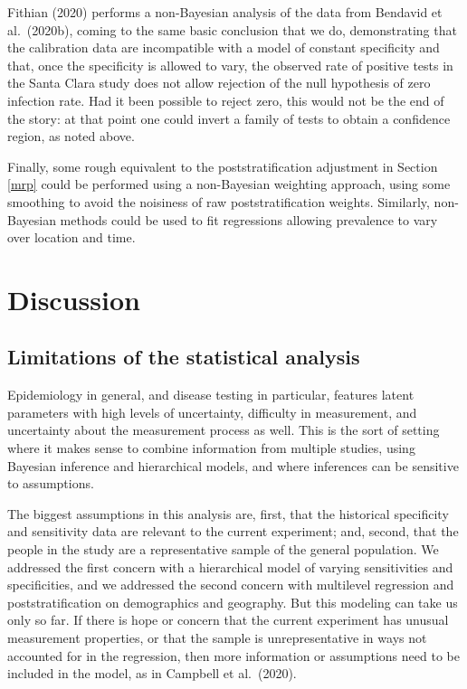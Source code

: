 \documentclass[11pt]{article}
\begin{document}
Fithian (2020) performs a non-Bayesian analysis of the data from Bendavid et al.\ (2020b), coming to the same basic conclusion that we do, demonstrating that the calibration data are incompatible with a model of constant specificity and that, once the specificity is allowed to vary, the observed rate of positive tests in the Santa Clara study does not allow rejection of the null hypothesis of zero infection rate.  Had it been possible to reject zero, this would not be the end of the story:  at that point one could invert a family of tests to obtain a confidence region, as noted above.

Finally, some rough equivalent to the poststratification adjustment in Section \ref{mrp} could be performed using a non-Bayesian weighting approach, using some smoothing to avoid the noisiness of raw poststratification weights.  Similarly, non-Bayesian methods could be used to fit regressions allowing prevalence to vary over location and time.


\section{Discussion}

\subsection{Limitations of the statistical analysis}

Epidemiology in general, and disease testing in particular, features
latent parameters with high levels of uncertainty, difficulty in
measurement, and uncertainty about the measurement process as well.
This is the sort of setting where it makes sense to combine
information from multiple studies, using Bayesian inference and
hierarchical models, and where inferences can be sensitive to
assumptions.

The biggest assumptions in this analysis are, first, that the
historical specificity and sensitivity data are relevant to the
current experiment; and, second, that the people in the study are a
representative sample of the general population.  We addressed the
first concern with a hierarchical model of varying sensitivities and
specificities, and we addressed the second concern with multilevel
regression and poststratification on demographics and geography.  But
this modeling can take us only so far.  If there is hope or concern
that the current experiment has unusual measurement properties, or
that the sample is unrepresentative in ways not accounted for in the
regression, then more information or assumptions need to be included
in the model, as in Campbell et al.\ (2020).
\end{document}
